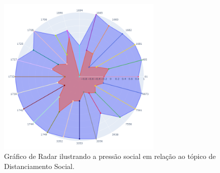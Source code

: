 \begin{figure}[htb]
	\centering
	\includegraphics[width=0.7\textwidth]{images/social_barometer_social_distancing.png}
	\caption{Gráfico de Radar ilustrando a pressão social em relação ao tópico de Distanciamento Social.}
	\label{fig:social_barometer_social_distancing}
\end{figure}

